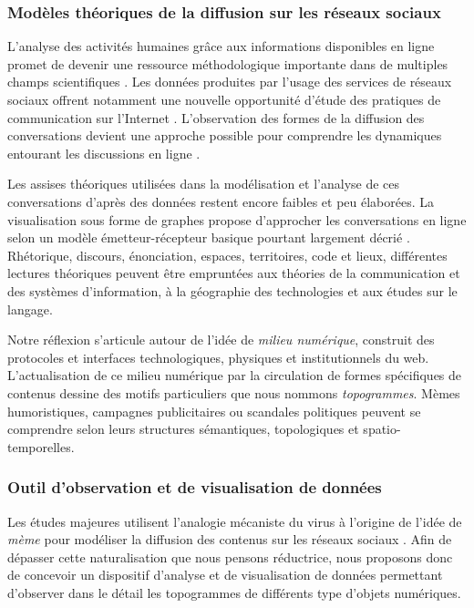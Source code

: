 \subsubsection{Modèles théoriques de la diffusion sur les réseaux sociaux}

L'analyse des activités humaines grâce aux informations disponibles en ligne promet de devenir une ressource méthodologique importante dans de multiples champs scientifiques \citep{Schreibman2007, Guichard2014}. Les données produites par l'usage des services de réseaux sociaux offrent notamment une nouvelle opportunité d'étude des pratiques de communication sur l'Internet \citep{Zook2007,Nettleton2013,Manovich2011}. L'observation des formes de la diffusion des conversations devient une approche possible pour comprendre les dynamiques entourant les discussions en ligne \citep{Conover2013,Leetaru2013}.
 
Les assises théoriques utilisées dans la modélisation et l'analyse de ces conversations d'après des données restent encore faibles et peu élaborées. La visualisation sous forme de graphes propose d'approcher les conversations en ligne selon un modèle émetteur-récepteur basique pourtant largement décrié \citep{Proulx2000}. Rhétorique, discours, énonciation, espaces, territoires, code et lieux, différentes lectures théoriques peuvent être empruntées aux théories de la communication et des systèmes d'information, à la géographie des technologies et aux études sur le langage.

Notre réflexion s'articule autour de l'idée de \textit{milieu numérique}, construit des protocoles et interfaces technologiques, physiques et institutionnels du web. L'actualisation de ce milieu numérique par la circulation de formes spécifiques de contenus dessine des motifs particuliers que nous nommons \textit{topogrammes}. Mèmes humoristiques, campagnes publicitaires ou scandales politiques peuvent se comprendre selon leurs structures sémantiques, topologiques et spatio-temporelles.

\subsubsection{Outil d'observation et de visualisation de données}

Les études majeures utilisent l'analogie mécaniste du virus à l'origine de l'idée de \textit{mème} \citep{Dawkins1989, Blackmore2001} pour modéliser la diffusion des contenus sur les réseaux sociaux \citep{Leskovec2005, Adamic2014}. Afin de dépasser cette naturalisation que nous pensons réductrice, nous proposons donc de concevoir un dispositif d'analyse et de visualisation de données permettant d'observer dans le détail les topogrammes de différents type d'objets numériques. 

